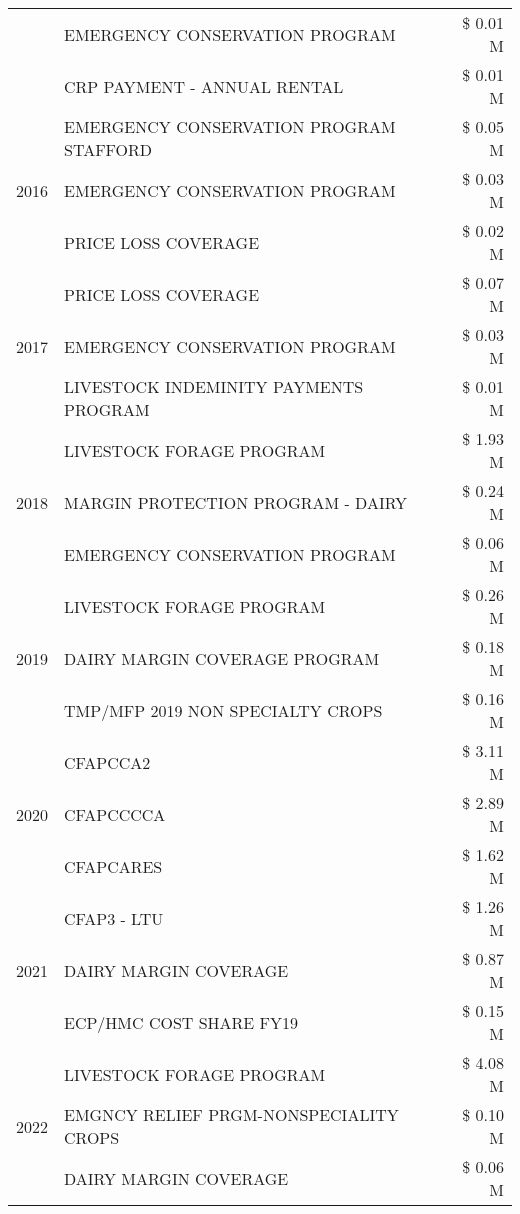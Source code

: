 \begin{tabular}{llr}
 & EMERGENCY CONSERVATION PROGRAM & \$ 0.01 M \\
 & CRP PAYMENT - ANNUAL RENTAL & \$ 0.01 M \\
\cline{1-3}
\multirow[t]{3}{*}{2016} & EMERGENCY CONSERVATION PROGRAM STAFFORD & \$ 0.05 M \\
 & EMERGENCY CONSERVATION PROGRAM & \$ 0.03 M \\
 & PRICE LOSS COVERAGE & \$ 0.02 M \\
\cline{1-3}
\multirow[t]{3}{*}{2017} & PRICE LOSS COVERAGE & \$ 0.07 M \\
 & EMERGENCY CONSERVATION PROGRAM & \$ 0.03 M \\
 & LIVESTOCK INDEMINITY PAYMENTS PROGRAM & \$ 0.01 M \\
\cline{1-3}
\multirow[t]{3}{*}{2018} & LIVESTOCK FORAGE PROGRAM & \$ 1.93 M \\
 & MARGIN PROTECTION PROGRAM - DAIRY & \$ 0.24 M \\
 & EMERGENCY CONSERVATION PROGRAM & \$ 0.06 M \\
\cline{1-3}
\multirow[t]{3}{*}{2019} & LIVESTOCK FORAGE PROGRAM & \$ 0.26 M \\
 & DAIRY MARGIN COVERAGE PROGRAM & \$ 0.18 M \\
 & TMP/MFP 2019 NON SPECIALTY CROPS & \$ 0.16 M \\
\cline{1-3}
\multirow[t]{3}{*}{2020} & CFAPCCA2 & \$ 3.11 M \\
 & CFAPCCCCA & \$ 2.89 M \\
 & CFAPCARES & \$ 1.62 M \\
\cline{1-3}
\multirow[t]{3}{*}{2021} & CFAP3 - LTU & \$ 1.26 M \\
 & DAIRY MARGIN COVERAGE & \$ 0.87 M \\
 & ECP/HMC COST SHARE FY19 & \$ 0.15 M \\
\cline{1-3}
\multirow[t]{3}{*}{2022} & LIVESTOCK FORAGE PROGRAM & \$ 4.08 M \\
 & EMGNCY RELIEF PRGM-NONSPECIALITY CROPS & \$ 0.10 M \\
 & DAIRY MARGIN COVERAGE & \$ 0.06 M \\
\cline{1-3}
\bottomrule
\end{tabular}
